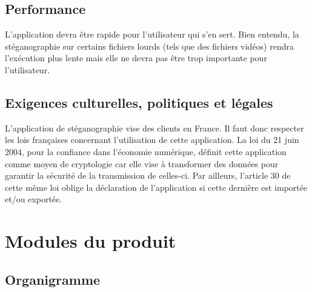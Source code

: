\documentclass[11pt]{article}
\begin{document}
\subsection{Performance}

L'application devra être rapide pour l'utilisateur qui s'en sert. Bien entendu,
la stéganographie sur certains fichiers lourds (tels que des fichiers vidéos)
rendra l'exécution plus lente mais elle ne devra pas être trop importante pour
l'utilisateur. 

\subsection{Exigences culturelles, politiques et légales}

L'application de stéganographie vise des clients en France. Il faut donc
respecter les lois françaises concernant l'utilisation de cette application. La
loi du 21 juin 2004, pour la confiance dans l'économie numérique, définit cette
application comme moyen de cryptologie car elle vise à transformer des données
pour garantir la sécurité de la transmission de celles-ci. Par ailleurs,
l'article 30 de cette même loi oblige la déclaration de l'application si cette
dernière est importée et/ou exportée. 

\section{Modules du produit}

\subsection{Organigramme}
\end{document}
